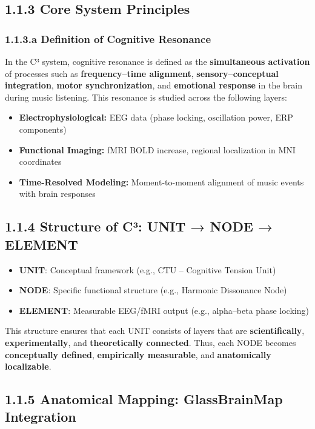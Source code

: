 \documentclass[10pt]{article}
\begin{document}
\subsection*{1.1.3 Core System Principles}

\subsubsection*{1.1.3.a Definition of Cognitive Resonance}

In the C³ system, cognitive resonance is defined as the \textbf{simultaneous activation} of processes such as \textbf{frequency–time alignment}, \textbf{sensory–conceptual integration}, \textbf{motor synchronization}, and \textbf{emotional response} in the brain during music listening. This resonance is studied across the following layers:

\begin{itemize}
    \item \textbf{Electrophysiological:} EEG data (phase locking, oscillation power, ERP components)
    \item \textbf{Functional Imaging:} fMRI BOLD increase, regional localization in MNI coordinates
    \item \textbf{Time-Resolved Modeling:} Moment-to-moment alignment of music events with brain responses
\end{itemize}

\subsection*{1.1.4 Structure of C³: UNIT → NODE → ELEMENT}

\begin{itemize}
    \item \textbf{UNIT}: Conceptual framework (e.g., CTU – Cognitive Tension Unit)
    \item \textbf{NODE}: Specific functional structure (e.g., Harmonic Dissonance Node)
    \item \textbf{ELEMENT}: Measurable EEG/fMRI output (e.g., alpha–beta phase locking)
\end{itemize}

This structure ensures that each UNIT consists of layers that are \textbf{scientifically}, \textbf{experimentally}, and \textbf{theoretically connected}. Thus, each NODE becomes \textbf{conceptually defined}, \textbf{empirically measurable}, and \textbf{anatomically localizable}.

\subsection*{1.1.5 Anatomical Mapping: GlassBrainMap Integration}
\end{document}
